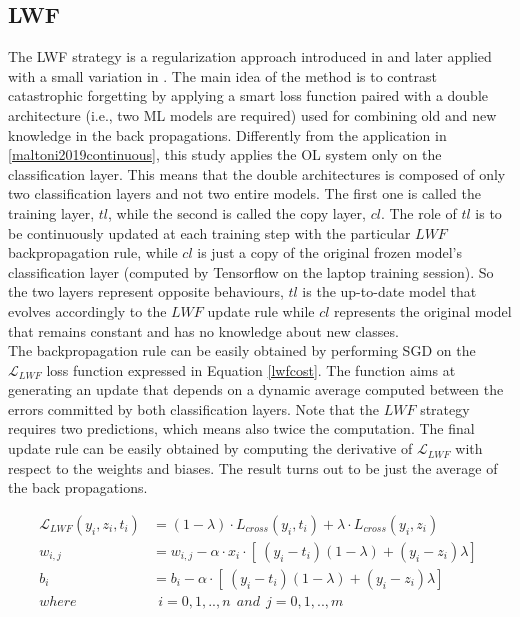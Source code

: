 \documentclass[12pt]{report}
\begin{document}
\subsection{LWF}
The LWF strategy is a regularization approach introduced in \autocite{li2017learning} and later applied with a small variation in \autocite{maltoni2019continuous}. The main idea of the method is to contrast catastrophic forgetting by applying a smart loss function paired with a double architecture (i.e., two ML models are required) used for combining old and new knowledge in the back propagations. Differently from the application in \ref{maltoni2019continuous}, this study applies the OL system only on the classification layer. This means that the double architectures is composed of only two classification layers and not two entire models. The first one is called the training layer, $tl$, while the second is called the copy layer, $cl$. The role of $tl$ is to be continuously updated at each training step with the particular $LWF$ backpropagation rule, while $cl$ is just a copy of the original frozen model's classification layer (computed by Tensorflow on the laptop training session). So the two layers represent opposite behaviours, $tl$ is the up-to-date model that evolves accordingly to the $LWF$ update rule while $cl$ represents the original model that remains constant and has no knowledge about new classes. \\
The backpropagation rule can be easily obtained by performing SGD on the $\mathcal{L}_{LWF}$ loss function expressed in Equation \ref{lwfcost}. The function aims at generating an update that depends on a dynamic average computed between the errors committed by both classification layers. Note that the $LWF$ strategy requires two predictions, which means also twice the computation. The final update rule can be easily obtained by computing the derivative of $\mathcal{L}_{LWF}$ with respect to the weights and biases. The result turns out to be just the average of the back propagations.

\begin{align}
	\mathcal{L}_{LWF} ( y_i, z_i, t_i) &=  (1-\lambda) \cdot{L}_{cross}(y_i, t_i) + \lambda \cdot{L}_{cross}(y_i, z_i) \label{lwfcost}\\
	w_{i,j} &= w_{i,j} - \alpha \cdot x_i \cdot [\ (y_i - t_i)(1-\lambda) + (y_i - z_i)\lambda ]\  \\
	b_i     &= b_i - \alpha \cdot [\ (y_i - t_i)(1-\lambda) + (y_i - z_i)\lambda ]\ \\
    where   & \: \: i= 0,1,..,n  \: \: and \: \:  j=0,1,..,m \nonumber  
\end{align}
\end{document}
